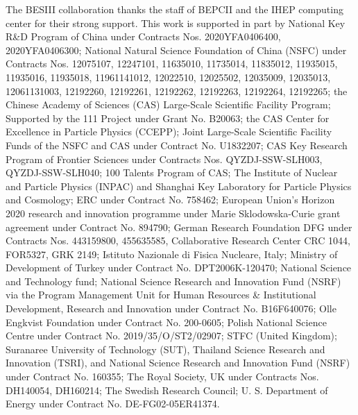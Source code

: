 \documentclass[a4paper,11pt]{article}
\begin{document}
\acknowledgments
The BESIII collaboration thanks the staff of BEPCII and the IHEP computing center for their strong support. This work is supported in part by National Key R\&D Program of China under Contracts Nos. 2020YFA0406400, 2020YFA0406300; National Natural Science Foundation of China (NSFC) under Contracts Nos. 
12075107, 12247101,
11635010, 11735014, 11835012, 11935015, 11935016, 11935018, 11961141012, 12022510, 12025502, 12035009, 12035013, 12061131003, 12192260, 12192261, 12192262, 12192263, 12192264, 12192265; 
the Chinese Academy of Sciences (CAS) Large-Scale Scientific Facility Program; 
Supported by the 111 Project under Grant No. B20063;
the CAS Center for Excellence in Particle Physics (CCEPP); Joint Large-Scale Scientific Facility Funds of the NSFC and CAS under Contract No. U1832207; CAS Key Research Program of Frontier Sciences under Contracts Nos. QYZDJ-SSW-SLH003, QYZDJ-SSW-SLH040; 100 Talents Program of CAS; The Institute of Nuclear and Particle Physics (INPAC) and Shanghai Key Laboratory for Particle Physics and Cosmology; ERC under Contract No. 758462; European Union's Horizon 2020 research and innovation programme under Marie Sklodowska-Curie grant agreement under Contract No. 894790; German Research Foundation DFG under Contracts Nos. 443159800, 455635585, Collaborative Research Center CRC 1044, FOR5327, GRK 2149; Istituto Nazionale di Fisica Nucleare, Italy; Ministry of Development of Turkey under Contract No. DPT2006K-120470; National Science and Technology fund; National Science Research and Innovation Fund (NSRF) via the Program Management Unit for Human Resources \& Institutional Development, Research and Innovation under Contract No. B16F640076; Olle Engkvist Foundation under Contract No. 200-0605; Polish National Science Centre under Contract No. 2019/35/O/ST2/02907; STFC (United Kingdom); Suranaree University of Technology (SUT), Thailand Science Research and Innovation (TSRI), and National Science Research and Innovation Fund (NSRF) under Contract No. 160355; The Royal Society, UK under Contracts Nos. DH140054, DH160214; The Swedish Research Council; U. S. Department of Energy under Contract No. DE-FG02-05ER41374.
\end{document}

